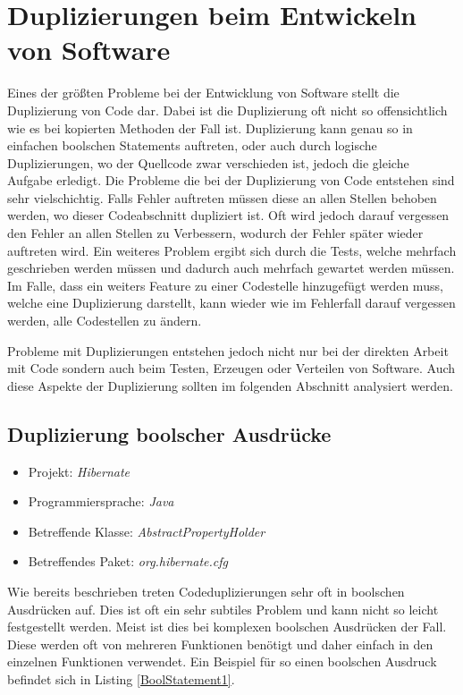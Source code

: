 \section{Duplizierungen beim Entwickeln von Software}
\SuperPar Eines der größten Probleme bei der Entwicklung von Software stellt die Duplizierung von Code dar. Dabei ist die Duplizierung oft nicht so offensichtlich wie es bei kopierten Methoden der Fall ist. Duplizierung kann genau so in einfachen boolschen Statements auftreten, oder auch durch logische Duplizierungen, wo der Quellcode zwar verschieden ist, jedoch die gleiche Aufgabe erledigt. Die Probleme die bei der Duplizierung von Code entstehen sind sehr vielschichtig. Falls Fehler auftreten müssen diese an allen Stellen behoben werden, wo dieser Codeabschnitt dupliziert ist. Oft wird jedoch darauf vergessen den Fehler an allen Stellen zu Verbessern, wodurch der Fehler später wieder auftreten wird. Ein weiteres Problem ergibt sich durch die Tests, welche mehrfach geschrieben werden müssen und dadurch auch mehrfach gewartet werden müssen. Im Falle, dass ein weiters Feature zu einer Codestelle hinzugefügt werden muss, welche eine Duplizierung darstellt, kann wieder wie im Fehlerfall darauf vergessen werden, alle Codestellen zu ändern.

Probleme mit Duplizierungen entstehen jedoch nicht nur bei der direkten Arbeit mit Code sondern auch beim Testen, Erzeugen oder Verteilen von Software. Auch diese Aspekte der Duplizierung sollten im folgenden Abschnitt analysiert werden.


\subsection{Duplizierung boolscher Ausdrücke}
\label{cha:BadBoolStatements}
\begin{itemize}
	\item Projekt: \textit{Hibernate}
	\item Programmiersprache: \textit{Java}
	\item Betreffende Klasse: \textit{AbstractPropertyHolder}
	\item Betreffendes Paket: \textit{org.hibernate.cfg}
\end{itemize}

\SuperPar Wie bereits beschrieben treten Codeduplizierungen sehr oft in boolschen Ausdrücken auf. Dies ist oft ein sehr subtiles Problem und kann nicht so leicht festgestellt werden. Meist ist dies bei komplexen boolschen Ausdrücken der Fall. Diese werden oft von mehreren Funktionen benötigt und daher einfach in den einzelnen Funktionen verwendet. Ein Beispiel für so einen boolschen Ausdruck befindet sich in Listing \ref{BoolStatement1}.

